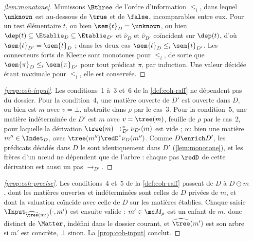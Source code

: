 \begin{proof}[\autoref{lem:monotone}]
Munissons \(\Bthree\) de l'ordre d'information \(\leq_i\), dans lequel
\(\unknown\) est au-dessous de \(\true\) et de \(\false\), incomparables entre
eux. Pour un test élémentaire \(t\), ou bien \(\sem{t}_D=\unknown\), ou bien
\(\dep(t)\subseteq\Etablie_D\subseteq\Etablie_{D'}\) et \(\widehat\nu_D\) et
\(\widehat\nu_{D'}\) coïncident sur \(\dep(t)\), d'où \(\sem{t}_{D'}=\sem{t}_D\) ;
dans les deux cas \(\sem{t}_D\leq_i\sem{t}_{D'}\). Les connecteurs forts de
Kleene sont monotones pour \(\leq_i\), de sorte que
\(\sem{\pi}_D\leq_i\sem{\pi}_{D'}\) pour tout prédicat \(\pi\), par induction.
Une valeur décidée étant maximale pour \(\leq_i\), elle est conservée.
\end{proof}

\begin{proof}[\autoref{prop:coh-input}]
Les conditions~1 à~3 et~6 de la \autoref{def:coh-raff} ne dépendent pas du
dossier. Pour la condition~4, une matière ouverte de \(D'\) est ouverte dans
\(D\), ou bien est \(m\) avec \(v=\bot\), abstraite dans \(\rho\) par le
cas~3. Pour la condition~5, une matière indéterminée de \(D'\) est \(m\) avec
\(v=\tree(m)\), feuille de \(\rho\) par le cas~2, pour laquelle la dérivation
\(\tree(m)\to_{D'}^{*}\nu_{D'}(m)\) est vide ; ou bien une matière
\(m''\in\Indet_D\), avec \(\tree(m'')\redD^{*}\nu_D(m'')\). Comme
\(D\enrich D'\), les prédicats décidés dans \(D\) le sont identiquement dans
\(D'\) (\autoref{lem:monotone}), et les frères d'un nœud ne dépendent que de
l'arbre : chaque pas \(\redD\) de cette dérivation est aussi un pas
\(\to_{D'}\).
\end{proof}


\begin{proof}[\autoref{prop:coh-precise}]
Les conditions~4 et~5 de la \autoref{def:coh-raff} passent de \(D\) à
\(D\ominus m\), dont les matières ouvertes et indéterminées sont celles de
\(D\) privées de \(m\), et dont la valuation coïncide avec celle de \(D\) sur
les matières établies. Chaque saisie \(\Input_{\widehat\tree(m')}(\cdot,m')\)
est ensuite valide : \(m'\in\mc M_\rho\) est un enfant de \(m\), donc
distinct de \(\Matter\), indéfini dans le dossier courant, et
\(\widehat\tree(m')\) est son arbre si \(m'\) est concrète, \(\bot\) sinon.
La \autoref{prop:coh-input} conclut.
\end{proof}

